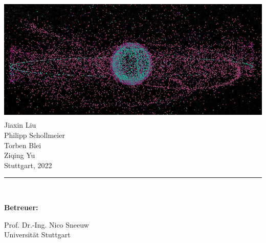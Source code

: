 \documentclass{article}
\begin{document}
\begin{minipage}[c][\textheight][t]{\textwidth}
	\includegraphics[height=6cm]{bilder/spacedebris.png}\\[10mm] %
	\vfill
	Jiaxin Liu\\[2mm]
	Philipp Schollmeier\\[2mm]
	Torben Blei\\[2mm]
	Ziqing Yu\\[10mm]
	Stuttgart, 2022\\[5mm]
	\rule{\textwidth}{0.5pt}\\[5mm]
	\begin{minipage}{\textwidth}%
		\hfill
		\begin{minipage}[t]{0.1\textwidth}%
			\large\textbf{Betreuer:}%
		\end{minipage}
		\quad
		\begin{minipage}[t][3.0cm]{0.6\textwidth}%
			\large Prof. Dr.-Ing. Nico Sneeuw\\
			Universität Stuttgart\\[3mm]
		\end{minipage}
		\hfill
	\end{minipage}
\end{minipage}
\clearpage	
\end{document}
